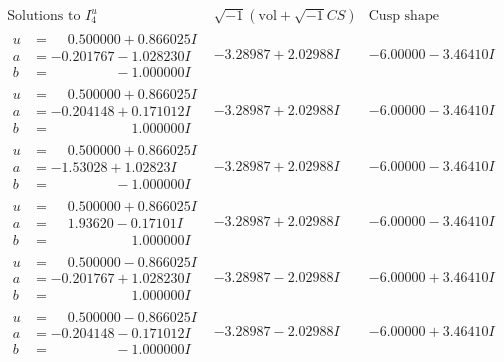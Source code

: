 \documentclass[1p]{elsarticle_modified}
\theoremstyle{definition}
\newcommand{\I}{\sqrt{-1}}
\begin{document}
$$\begin{array}{c|c|c}  
\text{Solutions to }I^u_{4}& \I (\text{vol} + \sqrt{-1}CS) & \text{Cusp shape}\\
 \hline 
\begin{aligned}
u &= \phantom{-}0.500000 + 0.866025 I \\
a &= -0.201767 - 1.028230 I \\
b &= \phantom{-0.000000 } -1.000000 I\end{aligned}
 & -3.28987 + 2.02988 I & -6.00000 - 3.46410 I \\ \hline\begin{aligned}
u &= \phantom{-}0.500000 + 0.866025 I \\
a &= -0.204148 + 0.171012 I \\
b &= \phantom{-0.000000 -}1.000000 I\end{aligned}
 & -3.28987 + 2.02988 I & -6.00000 - 3.46410 I \\ \hline\begin{aligned}
u &= \phantom{-}0.500000 + 0.866025 I \\
a &= -1.53028 + 1.02823 I \\
b &= \phantom{-0.000000 } -1.000000 I\end{aligned}
 & -3.28987 + 2.02988 I & -6.00000 - 3.46410 I \\ \hline\begin{aligned}
u &= \phantom{-}0.500000 + 0.866025 I \\
a &= \phantom{-}1.93620 - 0.17101 I \\
b &= \phantom{-0.000000 -}1.000000 I\end{aligned}
 & -3.28987 + 2.02988 I & -6.00000 - 3.46410 I \\ \hline\begin{aligned}
u &= \phantom{-}0.500000 - 0.866025 I \\
a &= -0.201767 + 1.028230 I \\
b &= \phantom{-0.000000 -}1.000000 I\end{aligned}
 & -3.28987 - 2.02988 I & -6.00000 + 3.46410 I \\ \hline\begin{aligned}
u &= \phantom{-}0.500000 - 0.866025 I \\
a &= -0.204148 - 0.171012 I \\
b &= \phantom{-0.000000 } -1.000000 I\end{aligned}
 & -3.28987 - 2.02988 I & -6.00000 + 3.46410 I \\ \hline\begin{aligned}

\end{aligned}
\end{array}$$
\end{document}
